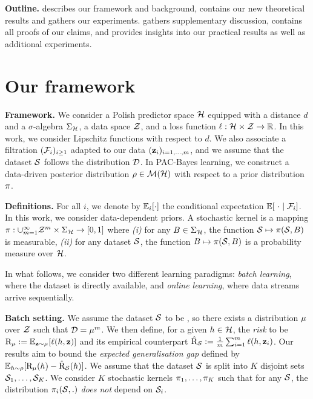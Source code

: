 \documentclass{article}
\begin{document}
\textbf{Outline.}  describes our framework and background,  contains our new theoretical results and  gathers our experiments. 
 gathers supplementary discussion,  contains all proofs of our claims, and  provides insights into our practical results as well as additional experiments.

\section{Our framework}
\label{sec:framework}

\textbf{Framework.} 
We consider a Polish predictor space $\H$ equipped with a distance $d$ and a $\sigma$-algebra $\Sigma_{\H}$, a data space $\Z$, and a loss function $\loss : \H\times \Z \rightarrow \R$.
In this work, we consider Lipschitz functions with respect to $d$.
We also associate a filtration $(\Fcal_{i})_{i\geq 1}$ adapted to our data $(\z_i)_{i=1,\dots,m}$, and we assume that the dataset $\S$ follows the distribution $\Dcal$.
In PAC-Bayes learning, we construct a data-driven posterior distribution $\Q\in\Mcal(\H)$ with respect to a prior distribution $\P$. 

\textbf{Definitions.} 
For all $i$, we denote by $\EE_{i}[\cdot]$ the conditional expectation $\EE[\ \cdot\mid \Fcal_i]$.
In this work, we consider data-dependent priors.
A stochastic kernel is a mapping $\P: \cup_{m=1}^\infty\Z^m\times \Sigma_{\H} \rightarrow [0,1]$ where {\it (i)} for any $B\in \Sigma_{\H}$, the function  $\S\mapsto \P(\S,B)$ is measurable, {\it (ii)} for any dataset $\S$, the function $B\mapsto \P(\S,B)$ is a probability measure over $\H$.

In what follows, we consider two different learning paradigms: \emph{batch learning}, where the dataset is directly available, and \emph{online learning}, where data streams arrive sequentially.

\textbf{Batch setting.} 
We assume the dataset $\S$ to be \iid, so there exists a distribution $\D$ over $\Z$ such that $\Dcal=\D^m$.
We then define, for a given $h\in\H$, the \emph{risk} to be $\Risk_\D\defeq\EE_{\z\sim \D}[\loss(h,\z)]$ and its empirical counterpart $\Riskhat_{\S} \defeq \frac{1}{m}\sum_{i=1}^m \loss(h,\z_i)$. 
Our results aim to bound the \emph{expected generalisation gap} defined by $\EE_{h\sim\Q}[ \Risk_{\D}(h) - \Riskhat_{\S}(h)]$.
We assume that the dataset $\S$ is split into $K$ disjoint sets $\S_1,\dots,\S_K$.
We consider $K$ stochastic kernels  $\P_1,\dots,\P_K$ such that for any $\S$, the distribution $\P_{i}(\S,.)$ {\it does not} depend on $\S_i$.
\end{document}
